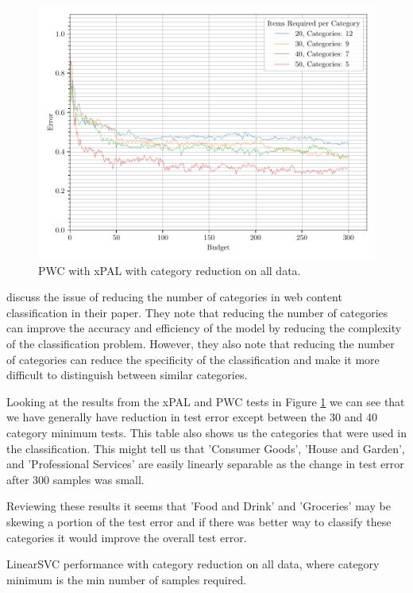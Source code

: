 \begin{figure}[ht]
    \centering
    \includegraphics[width=\textwidth]{../img/plot_text_data_all_category_reduction_test_results}
    \caption{PWC with xPAL with category reduction on all data.}
    \label{fig:all_data_category_reduction_xpal}
\end{figure}

\cite{dumais2000hierarchical} discuss the issue of reducing the number of categories in web content classification in their paper. They note that reducing the number of categories can improve the accuracy and efficiency of the model by reducing the complexity of the classification problem. However, they also note that reducing the number of categories can reduce the specificity of the classification and make it more difficult to distinguish between similar categories.

Looking at the results from the xPAL and PWC tests in Figure \ref{fig:all_data_category_reduction_xpal} we can see that we have generally have reduction in test error except between the 30 and 40 category minimum tests. This table also shows us the categories that were used in the classification. This might tell us that 'Consumer Goods', 'House and Garden', and 'Professional Services' are easily linearly separable as the change in test error after 300 samples was small.

Reviewing these results it seems that 'Food and Drink' and 'Groceries' may be skewing a portion of the test error and if there was better way to classify these categories it would improve the overall test error.

\begin{table}[ht]
     \centering  
     \caption{LinearSVC performance with category reduction on all data, where category minimum is the min number of samples required.}
     
     \label{tab:lscv_all_data_category_reduction} 
\end{table}

